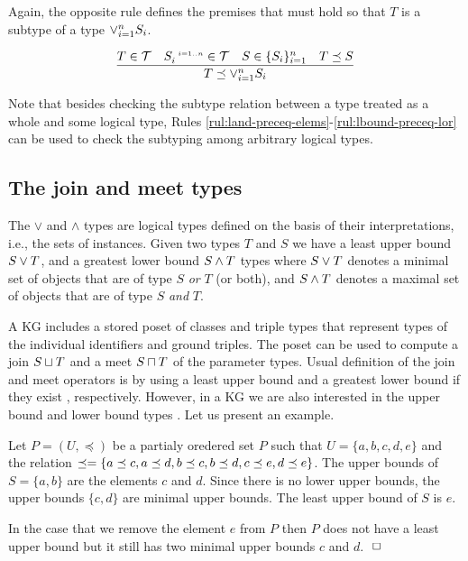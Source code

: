 \documentclass[runningheads]{llncs}
\newcommand{\s}{\scriptscriptstyle\ \,}
\newcommand{\T}{{\cal T}}
\newcommand{\finbox}{\phantom{.}\hfill\Box}
\begin{document}
Again, the opposite rule defines the premises that must hold so that
$T$ is a subtype of a type $\lor_{i=1}^n\/S_i$.

\begin{equation}
\label{rul:lbound-preceq-lor}
\dfrac{T\in\T\quad\/S_i^{\s\/i=1..n}\in\T\quad\/S\in\{S_i\}_{i=1}^n\quad\/T\preceq\/S}
      {T\preceq\lor_{i=1}^n\/S_i}  
\end{equation}

Note that besides checking the subtype relation between a type treated
as a whole and some logical type, Rules
\ref{rul:land-preceq-elems}-\ref{rul:lbound-preceq-lor} can be used to
check the subtyping among arbitrary logical types.






\subsection{The join and meet types\label{sec:join-meet-types}}

The $\lor$ and $\land$ types are logical types defined on the basis of
their interpretations, i.e., the sets of instances. Given two types
$T$ and $S$ we have a least upper bound $S\lor\/T$, and a greatest
lower bound $S\land\/T$ types where $S\lor\/T$ denotes a minimal set
of objects that are of type $S$ \emph{or} $T$ (or both), and
$S\land\/T$ denotes a maximal set of objects that are of type $S$
\emph{and} $T$.

A KG includes a stored poset of classes and triple types that
represent types of the individual identifiers and ground triples. The
poset can be used to compute a join $S\sqcup\/T$ and a meet
$S\sqcap\/T$ of the parameter types. Usual definition of the join and
meet operators is by using a least upper bound and a greatest lower
bound if they exist \cite{Pierce2002}, respectively. However, in a KG
we are also interested in the upper bound and lower bound types
\cite{DaveyPriestley2002}. Let us present an example.

\begin{example}
  Let $P=(U,\preceq)$ be a partialy oredered set $P$ such that
  $U=\{a,b,c,d,e\}$ and the relation
  $\preceq=\{a\preceq\/c,a\preceq\/d,b\preceq\/c,b\preceq\/d,c\preceq\/e,d\preceq\/e\}$.
  The upper bounds of $S=\{a,b\}$ are the elements $c$ and $d$. Since
  there is no lower upper bounds, the upper bounds $\{c,d\}$ are
  minimal upper bounds. The least upper bound of $S$ is $e$.

  In the case that we remove the element $e$ from $P$ then $P$ does
  not have a least upper bound but it still has two minimal upper
  bounds $c$ and $d$. $\finbox$
\end{example}
\end{document}
